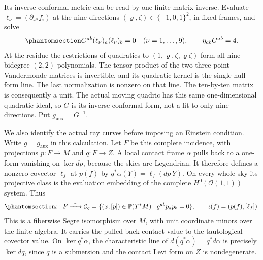 \documentclass[
  english,
  11pt,
  reqno]{amsart}
\begin{document}
Its inverse conformal metric can be read by one finite matrix inverse.
Evaluate \(\ell_\nu=(\partial_{x^a}f_i)\) at the nine directions
\((\varrho,\zeta)\in\{-1,0,1\}^2\), in fixed frames, and solve
\begin{equation}\protect\phantomsection\label{eq:gg-nine-direction-metric}{
 G^{ab}(\ell_\nu)_a(\ell_\nu)_b=0\quad(\nu=1,\ldots,9),
 \qquad \eta_{ab}G^{ab}=4 .
}\end{equation} At the residue the restrictions of quadratics to
\((1,\varrho,\zeta,\varrho\zeta)\) form all nine bidegree-\((2,2)\)
polynomials. The tensor product of the two three-point Vandermonde
matrices is invertible, and its quadratic kernel is the single null-form
line. The last normalization is nonzero on that line. The ten-by-ten
matrix is consequently a unit. The actual moving quadric has this same
one-dimensional quadratic ideal, so \(G\) is its inverse conformal form,
not a fit to only nine directions. Put \(g_{\mathrm{aux}}=G^{-1}\).

We also identify the actual ray curves before imposing an Einstein
condition. Write \(g=g_{\mathrm{aux}}\) in this calculation. Let \(F\)
be this complete incidence, with projections \(p:F\to M\) and
\(q:F\to Z\). A local contact frame \(\alpha\) pulls back to a one-form
vanishing on \(\ker dp\), because the skies are Legendrian. It therefore
defines a nonzero covector \(\ell_f\) at \(p(f)\) by
\(q^*\alpha(Y)=\ell_f(dp\,Y)\). On every whole sky its projective class
is the evaluation embedding of the complete \(H^0(\mathcal O(1,1))\)
system. Thus
\begin{equation}\protect\phantomsection\label{eq:gg-trial-characteristic-null-incidence}{
 \iota:F\xrightarrow{\ \sim\ }
 \mathcal C_g=\{(x,[p])\in\mathbb P(T^*M):
                         g^{ab}p_ap_b=0\},\qquad
 \iota(f)=(p(f),[\ell_f]).
}\end{equation} This is a fiberwise Segre isomorphism over \(M\), with
unit coordinate minors over the finite algebra. It carries the
pulled-back contact value to the tautological covector value. On
\(\ker q^*\alpha\), the characteristic line of
\(d(q^*\alpha)=q^*d\alpha\) is precisely \(\ker dq\), since \(q\) is a
submersion and the contact Levi form on \(Z\) is nondegenerate.
\end{document}
